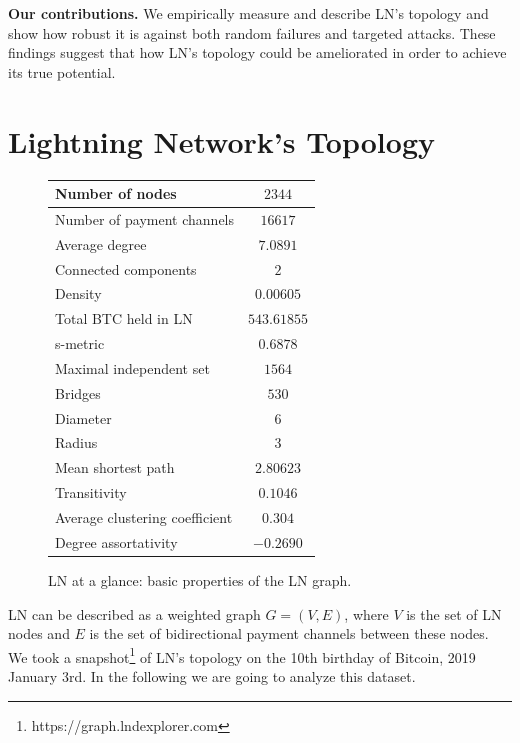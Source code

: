 \documentclass[a4paper]{article}
\theoremstyle{definition}
\def\bitcoinA{%
	\leavevmode
	\vtop{\offinterlineskip %
		\setbox0=\hbox{B}%
		\setbox2=\hbox to\wd0{\hfil\hskip-.03em
			\vrule height .3ex width .15ex\hskip .08em
			\vrule height .3ex width .15ex\hfil}
		\vbox{\copy2\box0}\box2}}
\begin{document}
\textbf{Our contributions.} We empirically measure and describe LN's topology and show how robust it is against both random failures and targeted attacks. These findings suggest that how LN's topology could be ameliorated in order to achieve its true potential.
\section{Lightning Network's Topology}
\begin{figure}
	\begin{tabular}{ | l | c | }
		\hline
		Number of nodes & $2344$  \\ \hline
		Number of payment channels & $16617$  \\ \hline
		Average degree & $7.0891$ \\ \hline
		Connected components & $2$  \\ \hline
		Density & $0.00605$ \\ \hline
		Total BTC held in LN & $543.61855$\bitcoinA\\ \hline
		s-metric& $0.6878$ \\ \hline
		Maximal independent set & $1564$ \\ \hline
		Bridges & $530$ \\ \hline
		Diameter & $6$ \\ \hline
		Radius & $3$ \\ \hline
		Mean shortest path &  $2.80623$ \\ \hline
		Transitivity& $0.1046$\\ \hline
		Average clustering coefficient&$0.304$ \\ \hline
		Degree assortativity& $-0.2690$ \\ \hline
	\end{tabular}
	\caption{LN at a glance: basic properties of the LN graph.}\label{fig:properties}
\end{figure}

LN can be described as a weighted graph $G=(V,E)$, where $V$ is the set of LN nodes and $E$ is the set of bidirectional payment channels between these nodes. We took a snapshot\footnote{https://graph.lndexplorer.com} of LN's topology on the 10th birthday of Bitcoin, 2019 January 3rd. In the following we are going to analyze this dataset.
\end{document}
